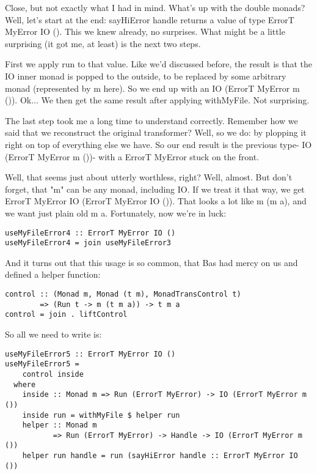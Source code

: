 Close, but not exactly what I had in mind. What's up with the double monads? Well, let's start at the end: sayHiError handle returns a value of type ErrorT MyError IO (). This we knew already, no surprises. What might be a little surprising (it got me, at least) is the next two steps.

First we apply run to that value. Like we'd discussed before, the result is that the IO inner monad is popped to the outside, to be replaced by some arbitrary monad (represented by m here). So we end up with an IO (ErrorT MyError m ()). Ok... We then get the same result after applying withMyFile. Not surprising.

The last step took me a long time to understand correctly. Remember how we said that we reconstruct the original transformer? Well, so we do: by plopping it right on top of everything else we have. So our end result is the previous type- IO (ErrorT MyError m ())- with a ErrorT MyError stuck on the front.

Well, that seems just about utterly worthless, right? Well, almost. But don't forget, that "m" can be any monad, including IO. If we treat it that way, we get ErrorT MyError IO (ErrorT MyError IO ()). That looks a lot like m (m a), and we want just plain old m a. Fortunately, now we're in luck:

\begin{lstlisting}
useMyFileError4 :: ErrorT MyError IO ()
useMyFileError4 = join useMyFileError3
\end{lstlisting}

And it turns out that this usage is so common, that Bas had mercy on us and defined a helper function:

\begin{lstlisting}
control :: (Monad m, Monad (t m), MonadTransControl t)
        => (Run t -> m (t m a)) -> t m a
control = join . liftControl
\end{lstlisting}

So all we need to write is:

\begin{lstlisting}
useMyFileError5 :: ErrorT MyError IO ()
useMyFileError5 =
    control inside
  where
    inside :: Monad m => Run (ErrorT MyError) -> IO (ErrorT MyError m ())
    inside run = withMyFile $ helper run
    helper :: Monad m
           => Run (ErrorT MyError) -> Handle -> IO (ErrorT MyError m ())
    helper run handle = run (sayHiError handle :: ErrorT MyError IO ())
\end{lstlisting}


